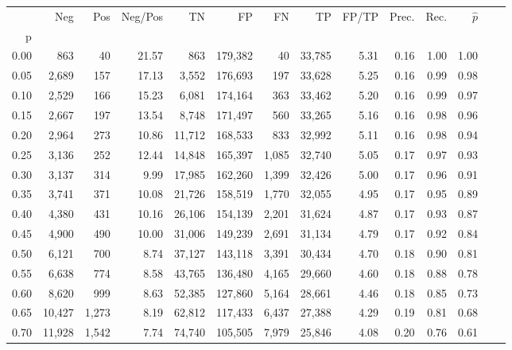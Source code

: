 \begin{tabular}{rrrrrrrrrrrrrr}
\toprule
{} &     Neg &    Pos & Neg/Pos &       TN &       FP &      FN &      TP & FP/TP & Prec. &  Rec. & $\hat{p}$ \\
p    &         &        &         &          &          &         &         &       &       &       &           \\
\midrule
0.00 &     863 &     40 &   21.57 &      863 &  179,382 &      40 &  33,785 &  5.31 &  0.16 &  1.00 &      1.00 \\
0.05 &   2,689 &    157 &   17.13 &    3,552 &  176,693 &     197 &  33,628 &  5.25 &  0.16 &  0.99 &      0.98 \\
0.10 &   2,529 &    166 &   15.23 &    6,081 &  174,164 &     363 &  33,462 &  5.20 &  0.16 &  0.99 &      0.97 \\
0.15 &   2,667 &    197 &   13.54 &    8,748 &  171,497 &     560 &  33,265 &  5.16 &  0.16 &  0.98 &      0.96 \\
0.20 &   2,964 &    273 &   10.86 &   11,712 &  168,533 &     833 &  32,992 &  5.11 &  0.16 &  0.98 &      0.94 \\
0.25 &   3,136 &    252 &   12.44 &   14,848 &  165,397 &   1,085 &  32,740 &  5.05 &  0.17 &  0.97 &      0.93 \\
0.30 &   3,137 &    314 &    9.99 &   17,985 &  162,260 &   1,399 &  32,426 &  5.00 &  0.17 &  0.96 &      0.91 \\
0.35 &   3,741 &    371 &   10.08 &   21,726 &  158,519 &   1,770 &  32,055 &  4.95 &  0.17 &  0.95 &      0.89 \\
0.40 &   4,380 &    431 &   10.16 &   26,106 &  154,139 &   2,201 &  31,624 &  4.87 &  0.17 &  0.93 &      0.87 \\
0.45 &   4,900 &    490 &   10.00 &   31,006 &  149,239 &   2,691 &  31,134 &  4.79 &  0.17 &  0.92 &      0.84 \\
0.50 &   6,121 &    700 &    8.74 &   37,127 &  143,118 &   3,391 &  30,434 &  4.70 &  0.18 &  0.90 &      0.81 \\
0.55 &   6,638 &    774 &    8.58 &   43,765 &  136,480 &   4,165 &  29,660 &  4.60 &  0.18 &  0.88 &      0.78 \\
0.60 &   8,620 &    999 &    8.63 &   52,385 &  127,860 &   5,164 &  28,661 &  4.46 &  0.18 &  0.85 &      0.73 \\
0.65 &  10,427 &  1,273 &    8.19 &   62,812 &  117,433 &   6,437 &  27,388 &  4.29 &  0.19 &  0.81 &      0.68 \\
0.70 &  11,928 &  1,542 &    7.74 &   74,740 &  105,505 &   7,979 &  25,846 &  4.08 &  0.20 &  0.76 &      0.61 \\

\end{tabular}
